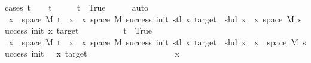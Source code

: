 \begin{isabellebody}
%
\isadelimproof
%
\endisadelimproof
%
\isatagproof
{}\isamarkupfalse%
{\isacharparenleft}{\kern0pt}cases\ t{\isacharparenright}{\kern0pt}\isanewline
\ \ \isamarkupfalse%
\ {\isachardoublequoteopen}t{\isachardoublequoteclose}\isanewline
\ \ \isamarkupfalse%
\ \isamarkupfalse%
\ {\isachardoublequoteopen}t\ {\isacharequal}{\kern0pt}\ True{\isachardoublequoteclose}\isanewline
\ \ \ \ \isamarkupfalse%
\ auto\isanewline
\ \ \ \isamarkupfalse%
\ {\isachardoublequoteopen}{\isacharbraceleft}{\kern0pt}x\ {\isasymin}\ space\ M{\isachardot}{\kern0pt}\ t\ {\isacharhash}{\kern0pt}{\isacharhash}{\kern0pt}\ x\ {\isasymin}\ {\isacharbraceleft}{\kern0pt}x{\isasymin}\ space\ M{\isachardot}{\kern0pt}\ success\ {\isacharparenleft}{\kern0pt}init{\isacharplus}{\kern0pt}{}{\isacharparenright}{\kern0pt}\ {\isacharparenleft}{\kern0pt}stl\ x{\isacharparenright}{\kern0pt}\ target\ {\isasymand}\ shd\ x{\isacharbraceright}{\kern0pt}{\isacharbraceright}{\kern0pt}\ {\isacharequal}{\kern0pt}\ {\isacharbraceleft}{\kern0pt}x{\isasymin}\ space\ M{\isachardot}{\kern0pt}\ success\ {\isacharparenleft}{\kern0pt}init{\isacharplus}{\kern0pt}{}{\isacharparenright}{\kern0pt}\ {\isacharparenleft}{\kern0pt}x{\isacharparenright}{\kern0pt}\ target{\isacharbraceright}{\kern0pt}{\isachardoublequoteclose}\isanewline
\ \ \ \ \ \ \ \ \ \ {\isachardoublequoteopen}t\ {\isacharequal}{\kern0pt}\ True{\isachardoublequoteclose}\isanewline
\ \ \ \ \ \ \isamarkupfalse%
\isanewline
\ \ \ \ \ \ \ \ \isamarkupfalse%
\ {\isachardoublequoteopen}{\isacharbraceleft}{\kern0pt}x\ {\isasymin}\ space\ M{\isachardot}{\kern0pt}\ t\ {\isacharhash}{\kern0pt}{\isacharhash}{\kern0pt}\ x\ {\isasymin}\ {\isacharbraceleft}{\kern0pt}x{\isasymin}\ space\ M{\isachardot}{\kern0pt}\ success\ {\isacharparenleft}{\kern0pt}init{\isacharplus}{\kern0pt}{}{\isacharparenright}{\kern0pt}\ {\isacharparenleft}{\kern0pt}stl\ x{\isacharparenright}{\kern0pt}\ target\ {\isasymand}\ shd\ x{\isacharbraceright}{\kern0pt}{\isacharbraceright}{\kern0pt}\ {\isasymsubseteq}\ {\isacharbraceleft}{\kern0pt}x\ {\isasymin}\ space\ M{\isachardot}{\kern0pt}\ success\ {\isacharparenleft}{\kern0pt}init\ {\isacharplus}{\kern0pt}\ {}{\isacharparenright}{\kern0pt}\ x\ target{\isacharbraceright}{\kern0pt}{\isachardoublequoteclose}\isanewline
\ \ \ \ \ \ \ \ \isamarkupfalse%
\isanewline
\ \ \ \ \ \ \ \ \ \ \isamarkupfalse%
\ x\isanewline
\ \ \ \ \ \ \ \ \ \ \isamarkupfalse%

\end{isabellebody}
